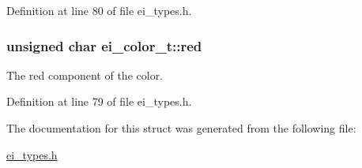 Definition at line 80 of file ei\-\_\-types.\-h.

\hypertarget{structei__color__t_a9adf283c79176b3426ac63784f0bc17b}{
\subsubsection[{red}]{\setlength{\rightskip}{0pt plus 5cm}unsigned char ei\-\_\-color\-\_\-t\-::red}}\label{structei__color__t_a9adf283c79176b3426ac63784f0bc17b}


The red component of the color. 



Definition at line 79 of file ei\-\_\-types.\-h.



The documentation for this struct was generated from the following file\-:\begin{DoxyCompactItemize}
\item 
\hyperlink{ei__types_8h}{ei\-\_\-types.\-h}\end{DoxyCompactItemize}
